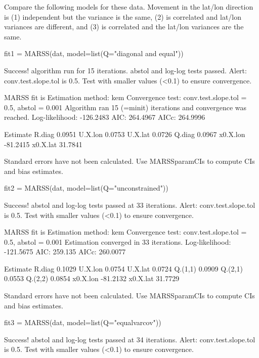 \begin{wideenumerate}
\item Compare the following models for these data.  Movement in the lat/lon direction is  (1) independent but the variance is the same, (2) is correlated and lat/lon variances are different, and (3) is correlated and the lat/lon variances are the same.  

\begin{Schunk}
\begin{Sinput}
 fit1 = MARSS(dat, model=list(Q="diagonal and equal"))
\end{Sinput}
\begin{Soutput}
Success! algorithm run for 15 iterations. abstol and log-log tests passed.
Alert: conv.test.slope.tol is 0.5.
Test with smaller values (<0.1) to ensure convergence.

MARSS fit is
Estimation method: kem 
Convergence test: conv.test.slope.tol = 0.5, abstol = 0.001
Algorithm ran 15 (=minit) iterations and convergence was reached. 
Log-likelihood: -126.2483 
AIC: 264.4967   AICc: 264.9996   
 
         Estimate
R.diag     0.0951
U.X.lon    0.0753
U.X.lat    0.0726
Q.diag     0.0967
x0.X.lon -81.2415
x0.X.lat  31.7841

Standard errors have not been calculated. 
Use MARSSparamCIs to compute CIs and bias estimates.
\end{Soutput}
\begin{Sinput}
 fit2 = MARSS(dat, model=list(Q="unconstrained"))
\end{Sinput}
\begin{Soutput}
Success! abstol and log-log tests passed at 33 iterations.
Alert: conv.test.slope.tol is 0.5.
Test with smaller values (<0.1) to ensure convergence.

MARSS fit is
Estimation method: kem 
Convergence test: conv.test.slope.tol = 0.5, abstol = 0.001
Estimation converged in 33 iterations. 
Log-likelihood: -121.5675 
AIC: 259.135   AICc: 260.0077   
 
         Estimate
R.diag     0.1029
U.X.lon    0.0754
U.X.lat    0.0724
Q.(1,1)    0.0909
Q.(2,1)    0.0553
Q.(2,2)    0.0854
x0.X.lon -81.2132
x0.X.lat  31.7729

Standard errors have not been calculated. 
Use MARSSparamCIs to compute CIs and bias estimates.
\end{Soutput}
\begin{Sinput}
 fit3 = MARSS(dat, model=list(Q="equalvarcov"))
\end{Sinput}
\begin{Soutput}
Success! abstol and log-log tests passed at 34 iterations.
Alert: conv.test.slope.tol is 0.5.
Test with smaller values (<0.1) to ensure convergence.


\end{Soutput}
\end{Schunk}
\end{wideenumerate}
